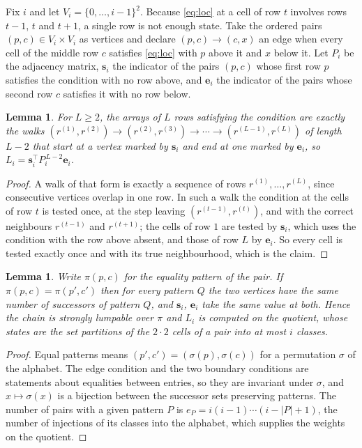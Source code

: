 \documentclass[11pt,a4paper]{article}
\theoremstyle{plain}
\newtheorem{lemma}[theorem]{Lemma}
\theoremstyle{definition}
\begin{document}
Fix $i$ and let $V_i=\{0,\dots,i-1\}^{2}$. Because \eqref{eq:loc} at a cell of row
$t$ involves rows $t-1$, $t$ and $t+1$, a single row is not enough state. Take the
ordered pairs $(p,c)\in V_i\times V_i$ as vertices and declare $(p,c)\to(c,x)$ an edge when
every cell of the middle row $c$ satisfies \eqref{eq:loc} with $p$ above it and $x$
below it. Let $P_i$ be the adjacency matrix, $\mathbf{s}_i$ the indicator of the pairs
$(p,c)$ whose first row $p$ satisfies the condition with no row above, and
$\mathbf{e}_i$ the indicator of the pairs whose second row $c$ satisfies it with no
row below.

\begin{lemma}\label{lem:walk}
For $L\ge2$, the arrays of $L$ rows satisfying the condition are exactly the walks
$(r^{(1)},r^{(2)})\to(r^{(2)},r^{(3)})\to\cdots\to(r^{(L-1)},r^{(L)})$ of length
$L-2$ that start at a vertex marked by $\mathbf{s}_i$ and end at one marked by
$\mathbf{e}_i$, so
$L_i=\mathbf{s}_i^{\!\top}P_i^{\,L-2}\mathbf{e}_i$.
\end{lemma}

\begin{proof}
A walk of that form is exactly a sequence of rows $r^{(1)},\dots,r^{(L)}$, since
consecutive vertices overlap in one row. In such a walk the condition at the cells of
row $t$ is tested once, at the step leaving $(r^{(t-1)},r^{(t)})$, and with the
correct neighbours $r^{(t-1)}$ and $r^{(t+1)}$; the cells of row $1$ are tested by
$\mathbf{s}_i$, which uses the condition with the row above absent, and those of row
$L$ by $\mathbf{e}_i$. So every cell is tested exactly once and with its true
neighbourhood, which is the claim.
\end{proof}

\begin{lemma}\label{lem:lump}
Write $\pi(p,c)$ for the equality pattern of the pair. If $\pi(p,c)=\pi(p',c')$ then for
every pattern $Q$ the two vertices have the same number of successors of pattern $Q$, and
$\mathbf{s}_i$, $\mathbf{e}_i$ take the same value at both. Hence the chain is strongly
lumpable over $\pi$ and $L_i$ is computed on the quotient, whose states are the set
partitions of the $2\cdot2$ cells of a pair into at most $i$ classes.
\end{lemma}

\begin{proof}
Equal patterns means $(p',c')=(\sigma(p),\sigma(c))$ for a permutation $\sigma$ of the
alphabet. The edge condition and the two boundary conditions are statements about equalities
between entries, so they are invariant under $\sigma$, and $x\mapsto\sigma(x)$ is a bijection
between the successor sets preserving patterns. The number of pairs with a given pattern $P$
is $e_P=i(i-1)\cdots(i-|P|+1)$, the number of injections of its classes into the alphabet,
which supplies the weights on the quotient.
\end{proof}
\end{document}
